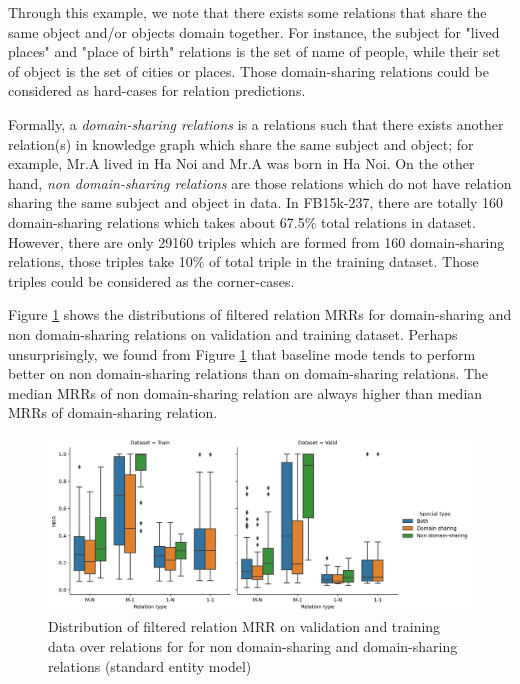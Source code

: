 Through this example, we note that there exists some relations that share the same object and/or objects domain together. For instance, the subject for "lived places" and "place of birth" relations is the set of name of people, while their set of object is the set of cities or places. Those domain-sharing relations could be considered as hard-cases for relation predictions. 

Formally, a \textit{domain-sharing relations} is a relations such that there exists another relation(s) in knowledge graph which share the same subject and object; for example, Mr.A lived in Ha Noi and Mr.A was born in Ha Noi. On the other hand, \textit{non domain-sharing relations} are those relations which do not have relation sharing the same subject and object in data. In FB15k-237, there are totally 160 domain-sharing relations which takes about 67.5\% total relations in dataset. However, there are only 29160 triples which are formed from 160 domain-sharing relations, those triples take 10\% of total triple in the training dataset. Those triples could be considered as the corner-cases. 

Figure \ref{fig:MRR relation in so pairs (standard entity)} shows the distributions of filtered relation MRRs for domain-sharing and non domain-sharing relations on validation and training dataset. Perhaps unsurprisingly, we found from Figure \ref{fig:MRR relation in so pairs (standard entity)} that baseline mode tends to perform better on non domain-sharing relations than on domain-sharing relations. The median MRRs of non domain-sharing relation are always higher than median MRRs of domain-sharing relation. 

\begin{figure}[!htbp]
	\begin{center}
	\includegraphics[width=\linewidth]{Images/MRR_relation_in_so_pairs (standard entity).png}
	\caption[Distribution of filtered relation MRR (standard entity)]{Distribution of filtered relation MRR on validation and training data over relations for for non domain-sharing and domain-sharing relations (standard entity model)}
	\label{fig:MRR relation in so pairs (standard entity)}
	\end{center}
\end{figure}

